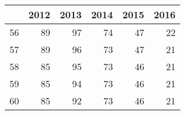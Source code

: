 \begin{tabular}{lrrrrr}
\toprule
{} &  2012 &  2013 &  2014 &  2015 &  2016 \\
\midrule
56 &    89 &    97 &    74 &    47 &    22 \\
57 &    89 &    96 &    73 &    47 &    21 \\
58 &    85 &    95 &    73 &    46 &    21 \\
59 &    85 &    94 &    73 &    46 &    21 \\
60 &    85 &    92 &    73 &    46 &    21 \\
\bottomrule
\end{tabular}
